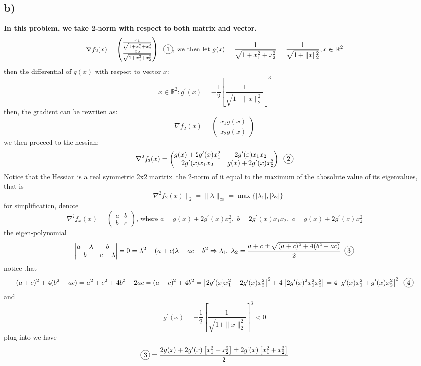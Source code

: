 \documentclass{article}
\newcommand*\circled[1]{\tikz[baseline=(char.base)]{
            \node[shape=circle,draw,inner sep=2pt] (char) {#1};}}
\newcommand{\subs}[1]{\subsection*{#1}}
\begin{document}
\subs{b)}
\textbf{In this problem, we take 2-norm with respect to both matrix and vector.}
\[
\nabla f_2(x) = \begin{pmatrix}
    \frac{x_1}{\sqrt{1+x_1^2+x_2^2}}\\
    \frac{x_2}{\sqrt{1+x_1^2+x_2^2}}
\end{pmatrix} \;\;\circled{1}\text{, we then let }g(x)=\frac{1}{\sqrt{1+x_1^2+x_2^2}} = \frac{1}{\sqrt{1+\|x\|_2^2}}, x\in \mathbb{R}^2
\]
then the differential of $g(x)$ with respect to vector $x$:
\[
x\in \mathbb{R}^2:g^\prime (x)=-\frac{1}{2}\left[\frac{1}{\sqrt{1+\|x\|_2^2}}\right]^3
\]
then, the gradient \circled{1} can be rewriten as:
\[
\nabla f_2(x)= 
\begin{pmatrix}
    x_1 g(x)\\
    x_2 g(x)
\end{pmatrix}
\]
we then proceed to the hessian:
\[
\nabla^2 f_2(x) = \begin{pmatrix}
    g(x)+2 g^\prime (x) x_1^2 & 2 g^\prime (x) x_1 x_2\\
    2 g^\prime (x) x_1 x_2 & g(x)+2g^\prime (x) x_2^2
\end{pmatrix}\;\;\circled{2}
\]
Notice that the Hessian is a real symmetric 2x2 martrix, the 2-norm of it equal to the maximum of the abosolute value of its eigenvalues, that is
\[
\|\nabla^2 f_2(x)\|_2 =\|\lambda\|_{\infty} =\max{\{|\lambda_1|,|\lambda_2|\}}
\]
for simplification, denote \[
\nabla^2 f_x(x) = \begin{pmatrix}
    a & b\\
    b & c
\end{pmatrix}\text{, where }a = g(x)+2 g^\prime (x) x_1^2,\; b = 2 g^\prime (x) x_1 x_2,\; c = g(x)+2g^\prime (x) x_2^2
\]
the eigen-polynomial
\[
\begin{vmatrix}
    a-\lambda & b\\
    b & c-\lambda
\end{vmatrix} = 0 = \lambda^2-(a+c)\lambda +ac-b^2 \Rightarrow
\lambda_1,\;\lambda_2 = \frac{a+c\pm \sqrt{(a+c)^2+4(b^2-ac)}}{2} \;\;\circled{3}
\]
notice that
\[
    (a+c)^2+4(b^2-ac) =a^2+c^2+4b^2-2ac = (a-c)^2+4b^2 =\left[
        2g^\prime (x) x_1^2-2g^\prime (x) x_2^2
    \right]^2+4 \left[
        2g^\prime(x)^2x_1^2 x_2^2
    \right] = 4 \left[
        g^\prime (x) x_1^2+g^\prime (x) x_2^2
    \right]^2 \;\;\circled{4}
\]
and \[
    g^\prime (x)=-\frac{1}{2}\left[\frac{1}{\sqrt{1+\|x\|_2^2}}\right]^3 < 0
\]
\circled{4} plug into \circled{3} we have 
\[
\circled{3} = \frac{2g(x)+2g^\prime (x)\left[x_1^2+x_2^2\right]\pm 2g^\prime (x)\left[x_1^2+x_2^2\right]}{2}\] 
\end{document}
